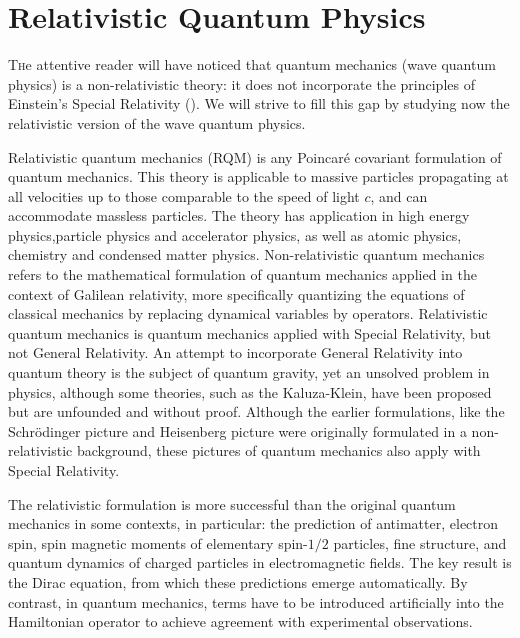	\newpage
	\thispagestyle{empty}
	\mbox{}
   	\section{Relativistic Quantum Physics}\label{relativistic quantum physics}
   	\lettrine[lines=4]{\color{BrickRed}T}he attentive reader will have noticed that quantum mechanics (wave quantum physics) is a non-relativistic theory: it does not incorporate the principles of Einstein's Special Relativity (). We will strive to fill this gap by studying now the relativistic version of the wave quantum physics.
   	
   	 Relativistic quantum mechanics (RQM) is any Poincaré covariant formulation of quantum mechanics. This theory is applicable to massive particles propagating at all velocities up to those comparable to the speed of light $c$, and can accommodate massless particles. The theory has application in high energy physics,particle physics and accelerator physics, as well as atomic physics, chemistry and condensed matter physics. Non-relativistic quantum mechanics refers to the mathematical formulation of quantum mechanics applied in the context of Galilean relativity, more specifically quantizing the equations of classical mechanics by replacing dynamical variables by operators. Relativistic quantum mechanics is quantum mechanics applied with Special Relativity, but not General Relativity. An attempt to incorporate General Relativity into quantum theory is the subject of quantum gravity, yet an unsolved problem in physics, although some theories, such as the Kaluza-Klein, have been proposed but are unfounded and without proof. Although the earlier formulations, like the Schrödinger picture and Heisenberg picture were originally formulated in a non-relativistic background, these pictures of quantum mechanics also apply with Special Relativity.

	The relativistic formulation is more successful than the original quantum mechanics in some contexts, in particular: the prediction of antimatter, electron spin, spin magnetic moments of elementary spin-$1/2$ particles, fine structure, and quantum dynamics of charged particles in electromagnetic fields. The key result is the Dirac equation, from which these predictions emerge automatically. By contrast, in quantum mechanics, terms have to be introduced artificially into the Hamiltonian operator to achieve agreement with experimental observations.

